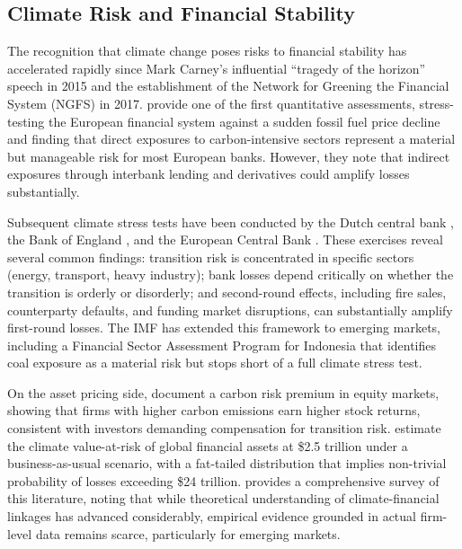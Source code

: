 \subsection{Climate Risk and Financial Stability}
\label{subsec:climate_risk}

The recognition that climate change poses risks to financial stability has accelerated rapidly since Mark Carney's influential ``tragedy of the horizon'' speech in 2015 and the establishment of the Network for Greening the Financial System (NGFS) in 2017. \citet{Battiston2017} provide one of the first quantitative assessments, stress-testing the European financial system against a sudden fossil fuel price decline and finding that direct exposures to carbon-intensive sectors represent a material but manageable risk for most European banks. However, they note that indirect exposures through interbank lending and derivatives could amplify losses substantially.

Subsequent climate stress tests have been conducted by the Dutch central bank \citep{Vermeulen2018}, the Bank of England \citep{BoE2019}, and the European Central Bank \citep{ECB2022}. These exercises reveal several common findings: transition risk is concentrated in specific sectors (energy, transport, heavy industry); bank losses depend critically on whether the transition is orderly or disorderly; and second-round effects, including fire sales, counterparty defaults, and funding market disruptions, can substantially amplify first-round losses. The IMF has extended this framework to emerging markets, including a Financial Sector Assessment Program for Indonesia \citep{IMF2024Indonesia} that identifies coal exposure as a material risk but stops short of a full climate stress test.

On the asset pricing side, \citet{BoltonKacperczyk2021} document a carbon risk premium in equity markets, showing that firms with higher carbon emissions earn higher stock returns, consistent with investors demanding compensation for transition risk. \citet{Dietz2016} estimate the climate value-at-risk of global financial assets at \$2.5 trillion under a business-as-usual scenario, with a fat-tailed distribution that implies non-trivial probability of losses exceeding \$24 trillion. \citet{Daumas2024} provides a comprehensive survey of this literature, noting that while theoretical understanding of climate-financial linkages has advanced considerably, empirical evidence grounded in actual firm-level data remains scarce, particularly for emerging markets.

